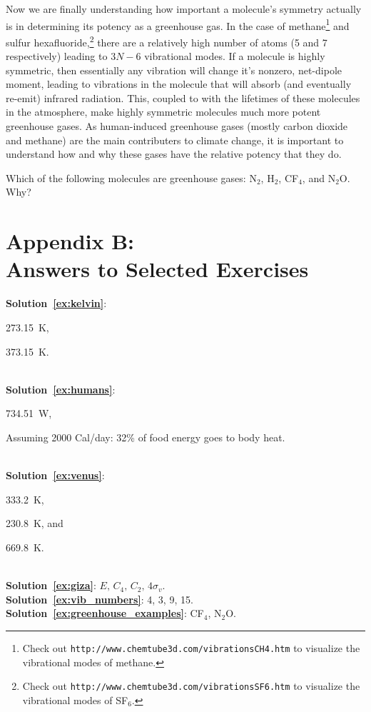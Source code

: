   
    Now we are finally understanding how important a molecule's symmetry actually is in determining its potency as a greenhouse gas. In the case of methane\footnote{Check out \texttt{http://www.chemtube3d.com/vibrationsCH4.htm} to visualize the vibrational modes of methane.} and sulfur hexafluoride,\footnote{Check out \texttt{http://www.chemtube3d.com/vibrationsSF6.htm} to visualize the vibrational modes of SF$_6$.} there are a relatively high number of atoms (5 and 7 respectively) leading to $3N - 6$ vibrational modes. If a molecule is highly symmetric, then essentially any vibration will change it's nonzero, net-dipole moment, leading to vibrations in the molecule that will absorb (and eventually re-emit) infrared radiation. This, coupled to with the lifetimes of these molecules in the atmosphere, make highly symmetric molecules much more potent greenhouse gases. As human-induced greenhouse gases (mostly carbon dioxide and methane) are the main contributers to climate change, it is important to understand how and why these gases have the relative potency that they do.

    \begin{exercise}
        Which of the following molecules are greenhouse gases: N$_2$, H$_2$, CF$_4$, and N$_2$O. Why?
        \label{ex:greenhouse_examples}
    \end{exercise}



\newpage
\section*{\label{app:answers}{\LARGE{Appendix B:}}\\Answers to Selected Exercises}
    \textbf{Solution~\ref{ex:kelvin}}: \begin{enumerate*}[(a)]
        \item \SI{273.15}{\kelvin}, 
        \item \SI{373.15}{\kelvin}.
    \end{enumerate*} \\
    \textbf{Solution~\ref{ex:humans}}: \begin{enumerate*}[(a)]
        \item \SI{734.51}{\watt}, 
        \item Assuming 2000 Cal/day: 32\% of food energy goes to body heat.
    \end{enumerate*}
    \\
    \textbf{Solution~\ref{ex:venus}}: \begin{enumerate*}[(a)]
        \item \SI{333.2}{\kelvin}, 
        \item \SI{230.8}{\kelvin}, and
        \item \SI{669.8}{\kelvin}.
    \end{enumerate*}   
    \\
    \textbf{Solution~\ref{ex:giza}}: $E,\, C_4,\, C_2,\, 4 \sigma_v.$ \\
    \textbf{Solution~\ref{ex:vib_numbers}}: 4, 3, 9, 15.  \\
    \textbf{Solution~\ref{ex:greenhouse_examples}}: CF$_4$, N$_2$O.
